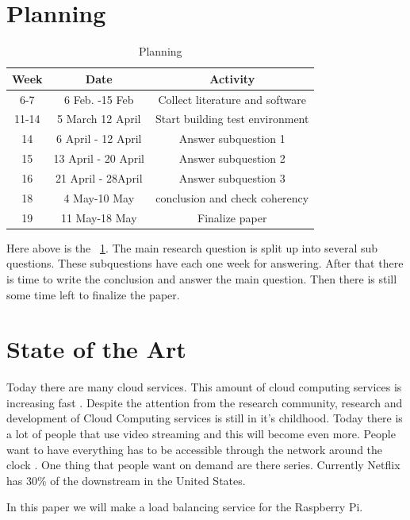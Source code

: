 \documentclass{sig-alternate-br}
\begin{document}
\section{Planning}

\begin{table}[H]
	\centering \caption{Planning}
	\begin{tabular}{|c|c|c|} \hline
		\textbf{Week} & \textbf{Date} & \textbf{Activity} \\ \hline 
		6-7&6 Feb. -15 Feb&Collect literature and software\\ \hline 
		11-14&5 March 12 April&Start building test environment\\ \hline
		14&6 April - 12 April&Answer subquestion 1\\ \hline
		15&13 April - 20 April&Answer subquestion 2\\ \hline
		16&21 April - 28April&Answer subquestion 3\\ \hline
		18&4 May-10 May& conclusion and check coherency \\ \hline
		19&11 May-18 May& Finalize paper \\ \hline
		\end{tabular}
		\label{tab:planning}
\end{table}
Here above is the ~\ref{tab:planning}. The main research question is split up into several sub questions. These subquestions have each one week for answering. After that there is time to write the conclusion and answer the main question. Then there is still some time left to finalize the paper. 

\section{State of the Art}
Today there are many cloud services. This amount of cloud computing services is increasing fast \cite{armbrust:2009}.  Despite the attention
from the research community, research and development of
Cloud Computing services is still in it's childhood\cite{tso:2013}. Today there is a lot of people that use video streaming and this will become even more. People want to have everything has to be accessible through the network around the clock \cite{youseff:2008}. One thing that people want on demand are there series. Currently Netflix has 30\% of the downstream in the United States. 

In this paper we will make a load balancing service for the Raspberry Pi.  



%
%
\vspace{50 mm}
\newpage
\end{document}
